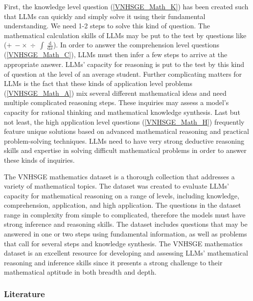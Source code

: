 \documentclass{article}
\begin{document}
{	First, the knowledge level question (\ref{VNHSGE_Math_K}) has been created such that LLMs can quickly and simply solve it using their fundamental understanding. We need 1-2 steps to solve this kind of question. The mathematical calculation skills of LLMs may be put to the test by questions like ($+~-\times~\div~\int~\frac{\mathrm{d} }{\mathrm{d} x}$). In order to answer the comprehension level questions (\ref{VNHSGE_Math_C}), LLMs must then infer a few steps to arrive at the appropriate answer. LLMs' capacity for reasoning is put to the test by this kind of question at the level of an average student. Further complicating matters for LLMs is the fact that these kinds of application level problems (\ref{VNHSGE_Math_A}) mix several different mathematical ideas and need multiple complicated reasoning steps. These inquiries may assess a model's capacity for rational thinking and mathematical knowledge synthesis. Last but not least, the high application level questions (\ref{VNHSGE_Math_H}) frequently feature unique solutions based on advanced mathematical reasoning and practical problem-solving techniques. LLMs need to have very strong deductive reasoning skills and expertise in solving difficult mathematical problems in order to answer these kinds of inquiries.
	
	The VNHSGE mathematics dataset is a thorough collection that addresses a variety of mathematical topics. The dataset was created to evaluate LLMs' capacity for mathematical reasoning on a range of levels, including knowledge, comprehension, application, and high application. The questions in the dataset range in complexity from simple to complicated, therefore the models must have strong inference and reasoning skills. The dataset includes questions that may be answered in one or two steps using fundamental information, as well as problems that call for several steps and knowledge synthesis. The VNHSGE mathematics dataset is an excellent resource for developing and assessing LLMs' mathematical reasoning and inference skills since it presents a strong challenge to their mathematical aptitude in both breadth and depth.
	
	\subsubsection{Literature}
	
}
\end{document}
